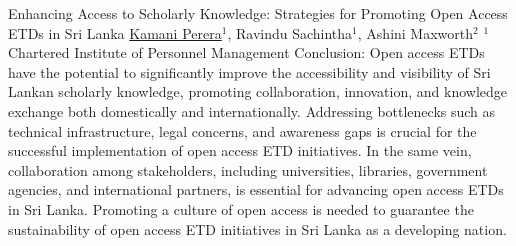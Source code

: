 \begin{abstract_online}{Enhancing Access to Scholarly Knowledge: Strategies for Promoting Open Access ETDs in Sri Lanka}{%
        \underline{Kamani Perera}$^{1}$, Ravindu Sachintha$^{1}$, Ashini Maxworth$^{2}$}{%
        }{
        $^1$ Chartered Institute of Personnel Management}{%
         }
    Conclusion: Open access ETDs have the potential to significantly improve the accessibility and visibility of Sri Lankan scholarly knowledge, promoting collaboration, innovation, and knowledge exchange both domestically and internationally. Addressing bottlenecks such as technical infrastructure, legal concerns, and awareness gaps is crucial for the successful implementation of open access ETD initiatives. In the same vein, collaboration among stakeholders, including universities, libraries, government agencies, and international partners, is essential for advancing open access ETDs in Sri Lanka. Promoting a culture of open access is needed to guarantee the sustainability of open access ETD initiatives in Sri Lanka as a developing nation.
\end{abstract_online}

